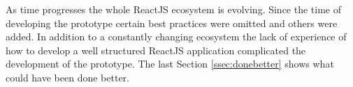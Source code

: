 As time progresses the whole ReactJS ecosystem is evolving. Since the time of developing the prototype certain best practices were omitted and others were added. In addition to a constantly changing ecosystem the lack of experience of how to develop a well structured ReactJS application complicated the development of the prototype. The last Section \ref{ssec:donebetter} shows what could have been done better.



